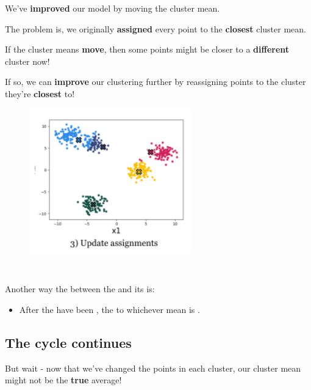         We've \textbf{improved} our model by moving the cluster mean.
        
        The problem is, we originally \textbf{assigned} every point to the \textbf{closest} cluster mean. 
        
        If the cluster means \textbf{move}, then some points might be closer to a \textbf{different} cluster now!
        
        If so, we can \textbf{improve} our clustering further by reassigning points to the cluster they're \textbf{closest} to!
        
        \begin{figure}[H]
            \centering
            \includegraphics[width=70mm,scale=0.4]{images/clustering_images/update_assignments_clustering.png}
        \end{figure}\\
        
        \begin{concept}
            Another way  the  between the  and its  is:
            
            \begin{itemize}
                \item After the  have been ,  the  to whichever mean is .
            \end{itemize} 
        \end{concept}
        
    \subsection{The cycle continues}
    
        But wait - now that we've changed the points in each cluster, our cluster mean might not be the \textbf{true} average!
        
